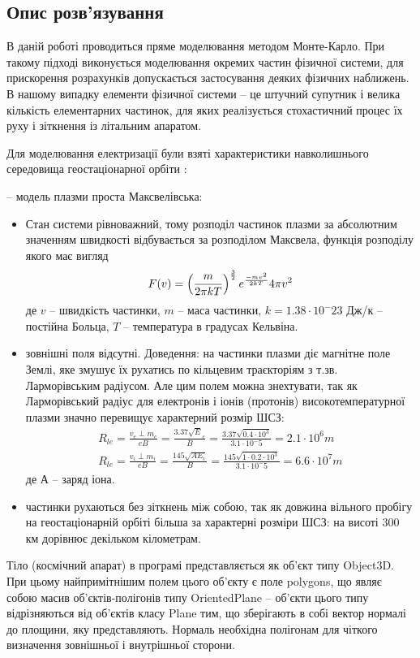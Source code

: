 \documentclass[a4paper,12pt]{article}
\begin{document}
\subsection{Опис розв’язування}
В даній роботі проводиться пряме моделювання методом Монте-Карло. При такому підході виконується моделювання окремих частин фізичної системи, для прискорення розрахунків допускається застосування деяких фізичних наближень. В нашому випадку елементи фізичної системи -- це штучний супутник і велика кількість елементарних частинок, для яких реалізується стохастичний процес їх руху і зіткнення із літальним апаратом.

Для моделювання електризації були взяті характеристики навколишнього середовища геостаціонарної орбіти \cite{novikov}:

-- модель плазми проста Максвелівська:
\renewcommand{\labelitemi}{$\circ$}
\begin{itemize}
 \item Стан системи рівноважний, тому розподіл частинок плазми за абсолютним значенням швидкості відбувається за розподілом Максвела, функція розподілу якого має вигляд
\[
  F(v) = \left(\frac{m}{2 \pi k T}\right)^{3 \over 2} e^\frac{-mv^2}{2 k T} 4 \pi v^2
\]
 де $v$ -- швидкість частинки, $m$ -- маса частинки, $k = 1.38 \cdot 10^-23$ Дж/к -- постійна Больца, $T$ -- температура в градусах Кельвіна.
 \item зовнішні поля відсутні. Доведення: на частинки плазми діє магнітне поле Землі, яке змушує їх рухатись по кільцевим траєкторіям з т.зв. Ларморівським радіусом. Але цим полем можна знехтувати, так як Ларморівський радіус для електронів і іонів (протонів) високотемпературної плазми значно перевищує характерний розмір ШСЗ:
\begin{eqnarray}
 R_{le} = \frac{v_e \perp m_e}{eB} = \frac{3.37 \sqrt E_e}{B} = \frac{3.37 \sqrt {0.4 \cdot 10^3}}{3.1 \cdot 10^-5} = 2.1 \cdot 10^6 m \\
 R_{le} = \frac{v_i \perp m_i}{eB} = \frac{145 \sqrt {A E_i}}{B} = \frac{145 \sqrt {1 \cdot 0.2 \cdot 10^3}}{3.1 \cdot 10^-5} = 6.6 \cdot 10^7 m
\end{eqnarray}
де А -- заряд іона.
\item частинки рухаються без зіткнень між собою, так як довжина вільного пробігу на геостаціонарній орбіті більша за характерні розміри ШСЗ: на висоті 300 км дорівнює декільком кілометрам.
\end{itemize}

Тіло (космічний апарат) в програмі представляється як об’єкт типу Object3D. При цьому найпримітнішим полем цього об’єкту є поле polygons, що являє собою масив об’єктів-полігонів типу OrientedPlane -- об’єкти цього типу відрізняються від об’єктів класу Plane тим, що зберігають в собі вектор нормалі до площини, яку представляють. Нормаль необхідна полігонам для чіткого визначення зовнішньої і внутрішньої сторони.
\end{document}

